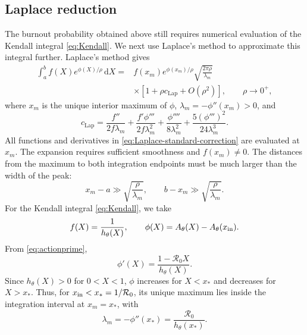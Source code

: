 \documentclass[11pt]{article}
\newcommand{\Rzero}{\mathcal R_0}
\newcommand{\rhoeps}{\rho}
\newcommand{\hth}{h_\theta}
\newcommand{\xs}{x_*}
\newcommand{\xin}{x_{\rm in}}
\newcommand{\Ath}{A_\theta}
\newcommand{\dd}{\,\mathrm d}
\begin{document}
\subsection{Laplace reduction}
The burnout probability obtained above still requires numerical evaluation of the Kendall integral \cref{eq:Kendall}. We next use Laplace's method to approximate this integral further.
Laplace's method \cite[Section~6.4]{BenderOrszag1978} gives
\begin{equation}
\begin{aligned}
\int_a^b f(X)e^{\phi(X)/\rhoeps}\dd X
={}&f(x_m)e^{\phi(x_m)/\rhoeps}
\sqrt{\frac{2\pi\rhoeps}{\lambda_m}}\\
&\times\left[1+\rhoeps c_{\mathrm{Lap}}+O(\rhoeps^2)\right],
\qquad \rhoeps\to0^+,
\end{aligned}
\label{eq:Laplace-standard}
\end{equation}
where \(x_m\) is the unique interior maximum of \(\phi\), \(\lambda_m=-\phi''(x_m)>0\), and
\begin{equation}
c_{\mathrm{Lap}}=
\frac{f''}{2f\lambda_m}
+\frac{f'\phi'''}{2f\lambda_m^2}
+\frac{\phi''''}{8\lambda_m^2}
+\frac{5(\phi''')^2}{24\lambda_m^3}.
\label{eq:Laplace-standard-correction}
\end{equation}
All functions and derivatives in \cref{eq:Laplace-standard-correction} are evaluated at \(x_m\). The expansion requires sufficient smoothness and \(f(x_m)\ne0\). The distances from the maximum to both integration endpoints must be much larger than the width of the peak:
\begin{equation}
x_m-a\gg\sqrt{\frac{\rhoeps}{\lambda_m}},\qquad
b-x_m\gg\sqrt{\frac{\rhoeps}{\lambda_m}}.
\label{eq:Laplace-endpoint-general}
\end{equation}
For the Kendall integral \cref{eq:Kendall}, we take
\begin{equation}
f(X)=\frac1{\hth(X)},\qquad
\phi(X)=\Ath(X)-\Ath(\xin).
\label{eq:Laplace-substitution}
\end{equation}
From \cref{eq:actionprime},
\begin{equation}
\phi'(X)=\frac{1-\Rzero X}{\hth(X)}.
\label{eq:Laplace-phase-derivative}
\end{equation}
Since \(\hth(X)>0\) for \(0<X<1\), \(\phi\) increases for \(X<\xs\) and decreases for \(X>\xs\). Thus, for \(\xin<\xs=1/\Rzero\), its unique maximum lies inside the integration interval at \(x_m=\xs\), with
\begin{equation}
\lambda_m=-\phi''(\xs)=\frac{\Rzero}{\hth(\xs)}.
\label{eq:Laplace-phase-curvature}
\end{equation}
\end{document}
